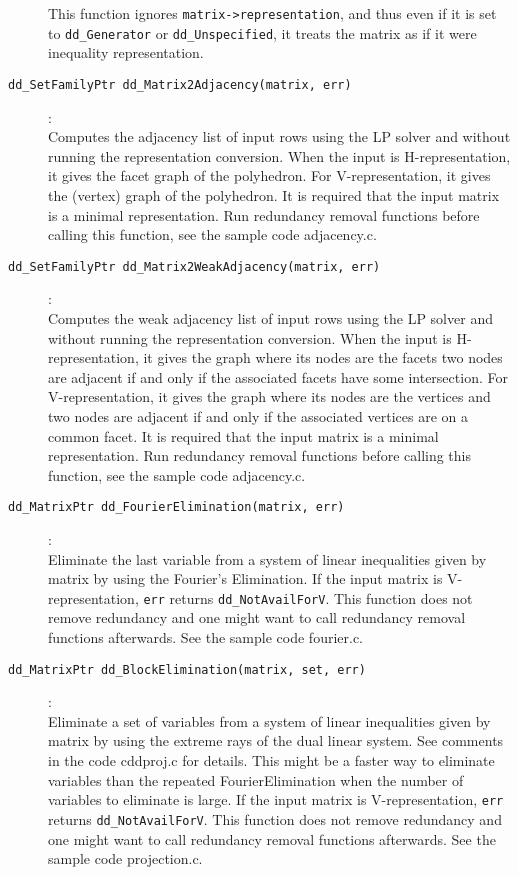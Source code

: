 \documentclass[11pt]{article}
\newcommand {\0} {{\bf 0}}
\begin{document}
\begin{description}
This function ignores {\tt matrix->representation}, and thus even if it is
set to {\tt dd\_Generator} or {\tt dd\_Unspecified}, it treats the matrix
as if it were inequality representation.

\item[{\tt dd\_SetFamilyPtr dd\_Matrix2Adjacency(matrix, err)}]:\\
Computes the adjacency list of input rows using
the LP solver and without running the representation conversion.  When
the input is H-representation, it gives the facet graph of the polyhedron.
For V-representation, it gives the (vertex) graph of the polyhedron.
It is required that the input matrix is a minimal representation.
Run redundancy removal functions before calling this function,
see the sample code adjacency.c. 


\item[{\tt dd\_SetFamilyPtr dd\_Matrix2WeakAdjacency(matrix, err)}]:\\
Computes the weak adjacency list of input rows using
the LP solver and without running the representation conversion.  When
the input is H-representation, it gives the graph where its nodes are the facets
two nodes  are adjacent if and only if the associated facets have
some intersection.
For V-representation, it gives the graph where its nodes are the vertices
and two nodes are adjacent if and only if the associated vertices
are on a common facet.
It is required that the input matrix is a minimal representation.
Run redundancy removal functions before calling this function,
see the sample code adjacency.c. 

\item[{\tt dd\_MatrixPtr dd\_FourierElimination(matrix, err)}]:\\
Eliminate the last variable from a system of linear inequalities
given by matrix by using the Fourier's Elimination.  If the 
input matrix is V-representation, {\tt  *err} returns
{\tt dd\_NotAvailForV}.   This function does not
remove redundancy  and one might want to call
redundancy removal functions afterwards. See the sample code fourier.c.

\item[{\tt dd\_MatrixPtr dd\_BlockElimination(matrix, set, err)}]:\\
Eliminate a set of variables from a system of linear inequalities
given by matrix by using the extreme rays of the dual linear system.
See comments in the code cddproj.c for details.  This might be
a faster way to eliminate variables than the repeated FourierElimination when
the number of variables to eliminate is large. 
If the input matrix is V-representation, {\tt  *err}  returns {\tt dd\_NotAvailForV}.
This function does not remove redundancy  and one might want to call
redundancy removal functions afterwards. See the sample code projection.c.



\end{description}
\end{document}

